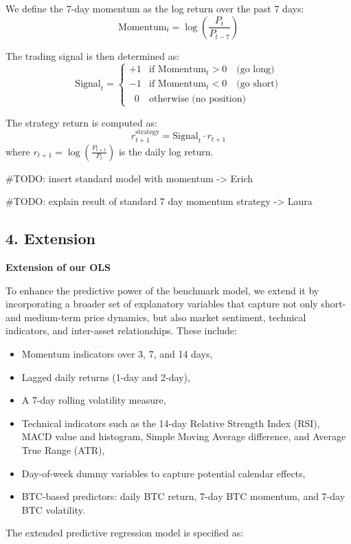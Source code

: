 \documentclass[
  12pt,
]{article}
\begin{document}
We define the 7-day momentum as the log return over the past 7 days: \[
\text{Momentum}_t = \log\left(\frac{P_t}{P_{t-7}}\right)
\]

The trading signal is then determined as: \[
\text{Signal}_t =
\begin{cases}
+1 & \text{if } \text{Momentum}_t > 0 \quad \text{(go long)} \\
-1 & \text{if } \text{Momentum}_t < 0 \quad \text{(go short)} \\
\;\;0 & \text{otherwise (no position)}
\end{cases}
\]

The strategy return is computed as: \[
r^{\text{strategy}}_{t+1} = \text{Signal}_t \cdot r_{t+1}
\] where \(r_{t+1} = \log\left(\frac{P_{t+1}}{P_t}\right)\) is the daily
log return.

\#TODO: insert standard model with momentum -\textgreater{} Erich

\#TODO: explain result of standard 7 day momentum strategy
-\textgreater{} Laura

\subsection{4. Extension}\label{extension}

\textbf{Extension of our OLS}

To enhance the predictive power of the benchmark model, we extend it by
incorporating a broader set of explanatory variables that capture not
only short- and medium-term price dynamics, but also market sentiment,
technical indicators, and inter-asset relationships. These include:

\begin{itemize}
  \item Momentum indicators over 3, 7, and 14 days,
  \item Lagged daily returns (1-day and 2-day),
  \item A 7-day rolling volatility measure,
  \item Technical indicators such as the 14-day Relative Strength Index (RSI), MACD value and histogram, Simple Moving Average difference, and Average True Range (ATR),
  \item Day-of-week dummy variables to capture potential calendar effects,
  \item BTC-based predictors: daily BTC return, 7-day BTC momentum, and 7-day BTC volatility.
\end{itemize}

The extended predictive regression model is specified as:
\end{document}
